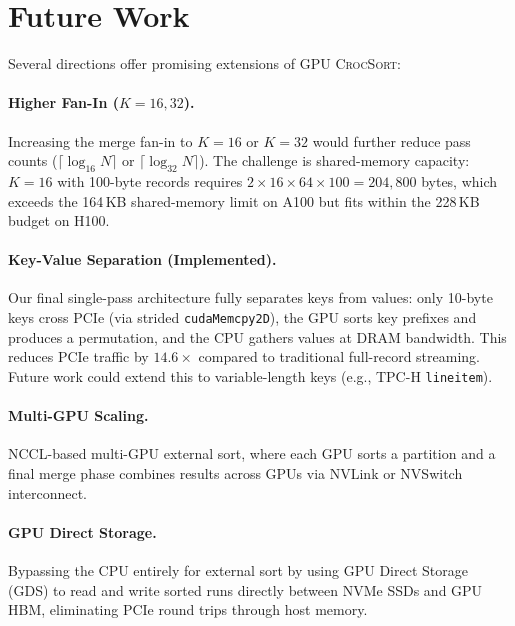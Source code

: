 \documentclass[conference,10pt]{IEEEtran}
\newcommand{\gpucrocsort}{\textsc{GPU CrocSort}\xspace}
\begin{document}
\section{Future Work}
\label{sec:future}

Several directions offer promising extensions of \gpucrocsort:

\paragraph{Higher Fan-In ($K{=}16, 32$).}
Increasing the merge fan-in to $K{=}16$ or $K{=}32$ would further reduce
pass counts ($\lceil\log_{16} N\rceil$ or $\lceil\log_{32} N\rceil$).
The challenge is shared-memory capacity: $K{=}16$ with 100-byte records
requires $2 \times 16 \times 64 \times 100 = 204{,}800$ bytes, which
exceeds the 164\,KB shared-memory limit on A100 but fits within the
228\,KB budget on H100.

\paragraph{Key-Value Separation (Implemented).}
Our final single-pass architecture fully separates keys from values:
only 10-byte keys cross PCIe (via strided \texttt{cudaMemcpy2D}), the
GPU sorts key prefixes and produces a permutation, and the CPU gathers
values at DRAM bandwidth.  This reduces PCIe traffic by $14.6\times$
compared to traditional full-record streaming.  Future work could
extend this to variable-length keys (e.g., TPC-H \texttt{lineitem}).

\paragraph{Multi-GPU Scaling.}
NCCL-based multi-GPU external sort, where each GPU sorts a partition and
a final merge phase combines results across GPUs via NVLink or
NVSwitch interconnect.

\paragraph{GPU Direct Storage.}
Bypassing the CPU entirely for external sort by using GPU Direct Storage
(GDS) to read and write sorted runs directly between NVMe SSDs and GPU
HBM, eliminating PCIe round trips through host memory.
\end{document}
